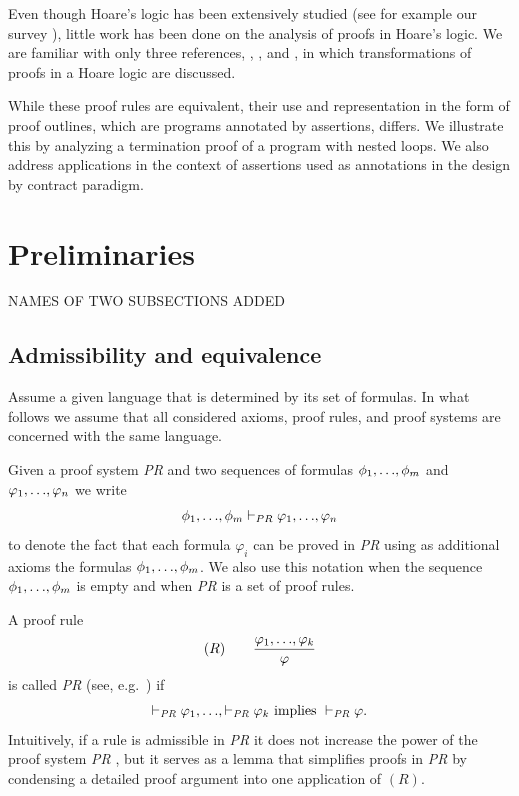 \documentclass[runningheads]{llncs}       %
\begin{document}
Even though Hoare's logic has been extensively studied (see for
example our survey \cite{AO19}), little work has been done on the
analysis of proofs in Hoare's logic. We are familiar with only three
references, \cite{Apt81a}, \cite{GR16}, and \cite{Tiu02}, in which
transformations of proofs in a Hoare logic are discussed.

While these proof rules are equivalent, their use and representation
in the form of proof outlines, which are programs annotated by
assertions, differs. We illustrate this by analyzing a termination
proof of a program with nested loops. We also address applications in
the context of assertions used as annotations in the design by
contract paradigm.



\section{Preliminaries}

NAMES OF TWO SUBSECTIONS ADDED

\subsection{Admissibility and equivalence}

Assume a given language that is determined by its set of formulas.  In
what follows we assume that all considered axioms, proof rules, and
proof systems are concerned with the same language.

Given a proof system \emph{PR} and two sequences of formulas
$\phi_1, \mbox{$\ldots$}, \phi_m$ and $\varphi_1, \mbox{$\ldots$}, \varphi_n$ we write
\[
  \phi_1, \mbox{$\ldots$}, \phi_m \vdash_{PR} \varphi_1, \mbox{$\ldots$}, \varphi_n
\]
to denote the fact that each formula $\varphi_i$ can be proved in
\emph{PR} using as additional axioms the formulas
$\phi_1, \mbox{$\ldots$}, \phi_m$.  We also use this notation when the sequence
$\phi_1, \mbox{$\ldots$}, \phi_m$ is empty and when \emph{PR} is a set of proof
rules.

A proof rule
\[ 
  (R) \qquad \frac{\varphi_1,\mbox{$\ldots$},\varphi_k}{\varphi}
\]
is called  \emph{PR} (see, e.g.~\cite{Pla13}) if
\[
 \vdash_{\mathit{PR}} \varphi_1, \mbox{$\ldots$}, \vdash_{\mathit{PR}} \varphi_k
 \mbox{ implies }
 \vdash_{\mathit{PR}} \varphi.
\]
Intuitively, if a rule is admissible in \emph{PR}
it does not increase the power of the proof system \emph{PR} \cite{Pla13}, 
but it serves as a lemma that simplifies proofs in \emph{PR} by condensing
a detailed proof argument into one application of $(R)$.
\end{document}
